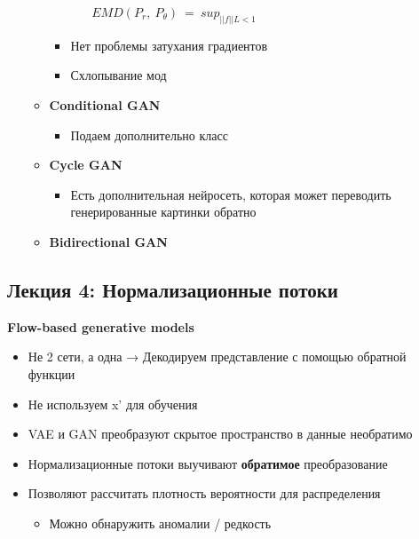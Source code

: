 \documentclass[a4paper, 12pt]{article}
\begin{document}
\begin{itemize}
\begin{itemize}
\begin{itemize}
\begin{itemize}
        \(EMD(P_{r},\ P_{\theta})\  = \ sup_{||f||L < 1}\)
      \end{itemize}
    \item Нет проблемы затухания градиентов
    \item Схлопывание мод
    \end{itemize}
  \item \textbf{Conditional GAN}
    \begin{itemize}
    \item Подаем дополнительно класс
    \end{itemize}
  \item \textbf{Cycle GAN}
    \begin{itemize}
    \item Есть дополнительная нейросеть, которая может переводить
      генерированные картинки обратно
    \end{itemize}
  \item \textbf{Bidirectional GAN}
  \end{itemize}
\end{itemize}

\subsection{Лекция 4: Нормализационные потоки}

\textbf{{Flow-based generative models}}

\begin{itemize}
\item
  
  Не 2 сети, а одна → Декодируем представление с помощью обратной
  функции
  
\item
  
  Не используем x' для обучения
  
\item
  
  VAE и GAN преобразуют скрытое пространство в данные
  {{необратимо}}
  
\item
  
  Нормализационные потоки выучивают {\textbf{обратимое}
  преобразование}
  
\item
  
  Позволяют рассчитать плотность вероятности для распределения
  

  \begin{itemize}
  \item
    
    Можно обнаружить аномалии / редкость
    
  \end{itemize}
\end{itemize}
\end{document}
